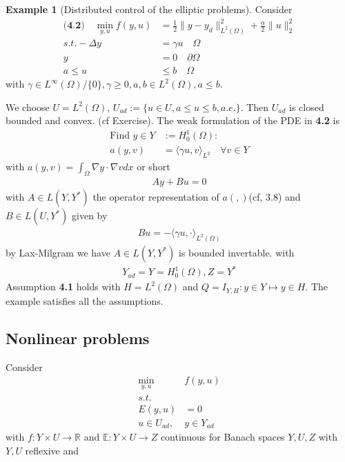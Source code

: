 \documentclass[a4paper,11pt,fleqn]{book}
\theoremstyle{definition}
\newtheorem*{example}{Example}
\theoremstyle{remark}
\begin{document}
\begin{example}[Distributed control of the elliptic problems]
	Consider 
	\begin{align*}
		\textbf{(4.2)}\quad
		\min_{y, u} f(y, u) &= \frac{1}{2}\|y - y_d\|^2_{L^2(\Omega)} + \frac{\alpha}{2} \|u\|^2_2\\
		s.t. -\Delta y &= \gamma u \quad \Omega\\
			y &= 0 \quad \partial \Omega\\
			a \le u &\le b \quad \Omega
	\end{align*}
	with $\gamma \in L^\infty(\Omega) \slash \{0\}, \gamma \geq 0, a , b \in L^2(\Omega), a \le b$. \par 
	We choose $U = L^2(\Omega)$, $U_{ad}:= \{ u \in U, a \le u \le b , a.e. \}$. Then $U_{ad}$ is closed bounded and convex. (cf Exercise). The weak formulation of the PDE in \textbf{4.2} is 
	\begin{align*}
		\text{Find } y \in Y&:= H_0^1(\Omega):\\
		a(y, v) &= \langle \gamma u, v \rangle_{L^2} \quad \forall v \in Y
	\end{align*}
	with $a(y, v) = \int_\Omega \nabla y \cdot \nabla v dx$ or short
	\begin{align*}
		Ay + Bu = 0
	\end{align*}
	with $A \in L(Y, Y^*)$ the operator representation of $a(, )$(cf, 3.8) and $B \in L(U, Y^*)$ given by 
	\begin{align*}
		Bu = - \langle \gamma u, \cdot \rangle_{L^2(\Omega)}
	\end{align*}
	by Lax-Milgram we have $A \in L(Y, Y^*)$ is bounded invertable. with 
	\begin{align*}
		Y_{ad} = Y = H_0^1(\Omega), Z = Y^*
	\end{align*}
	Assumption \textbf{4.1} holds with $H= L^2(\Omega)$ and $Q = I_{Y, H}: y \in Y \mapsto y \in H$. The example satisfies all the assumptions. 
\end{example}


\subsection{Nonlinear problems}
Consider 
\begin{align*}
	\min_{y, u} &f(y, u)\\
	s.t.\\
	 E(y, u) &= 0\\
	 u \in U_{ad},& y \in Y_{ad}
\end{align*}
with $f: Y \times U \rightarrow \mathbb{R}$ and $\mathbb{E}: Y \times U \rightarrow Z$ continuous for Banach spaces $Y, U, Z$ with $Y, U$ reflexive and 
\end{document}
